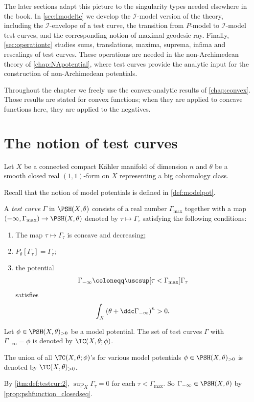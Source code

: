 The later sections adapt this picture to the singularity types needed elsewhere in the book. In \cref{sec:Imodeltc} we develop the $\mathcal I$-model version of the theory, including the $\mathcal I$-envelope of a test curve, the transition from $P$-model to $\mathcal I$-model test curves, and the corresponding notion of maximal geodesic ray. Finally, \cref{sec:operationtc} studies sums, translations, maxima, suprema, infima and rescalings of test curves. These operations are needed in the non-Archimedean theory of \cref{chap:NApotential}, where test curves provide the analytic input for the construction of non-Archimedean potentials.

Throughout the chapter we freely use the convex-analytic results of \cref{chap:convex}. Those results are stated for convex functions; when they are applied to concave functions here, they are applied to the negatives.


\section{The notion of test curves}\label{sec:tc}

Let $X$ be a connected compact K\"ahler manifold of dimension $n$ and $\theta$ be a smooth closed real $(1,1)$-form on $X$ representing a big cohomology class.

Recall that the notion of model potentials is defined in \cref{def:modelpot}.
\begin{definition}\label{def:testcur}
    A \emph{test curve} $\Gamma$ in $\PSH(X,\theta)$ consists of a real number $\Gamma_{\max}$ together with a map $(-\infty,\Gamma_{\max})\rightarrow \PSH(X,\theta)$ denoted by $\tau\mapsto \Gamma_{\tau}$ satisfying the following conditions:
    \begin{enumerate}
        \item\label{itm:def:testcur:1} The map $\tau\mapsto \Gamma_{\tau}$ is concave and decreasing;
        \item\label{itm:def:testcur:2} $P_{\theta}[\Gamma_{\tau}]=\Gamma_{\tau}$;
        \item\label{itm:def:testcur:3} the potential
        \begin{equation}\label{eq:Gammaminf}
        \Gamma_{-\infty}\coloneqq \uscsup[\tau<\Gamma_{\max}]\Gamma_{\tau}
        \end{equation}
        satisfies
        \[
        \int_X \left(\theta+\ddc \Gamma_{-\infty}\right)^n>0.
        \]
    \end{enumerate}
    Let $\phi\in \PSH(X,\theta)_{>0}$ be a model potential.
    The set of test curves $\Gamma$ with $\Gamma_{-\infty}=\phi$ is denoted by $\TC(X,\theta;\phi)$.

    The union of all $\TC(X,\theta;\phi)$'s for various model potentials $\phi\in \PSH(X,\theta)_{>0}$ is denoted by $\TC(X,\theta)_{>0}$.
\end{definition}
By \ref{itm:def:testcur:2}, $\sup_{X}\Gamma_{\tau}=0$ for each $\tau<\Gamma_{\max}$. So $\Gamma_{-\infty}\in \PSH(X,\theta)$ by \cref{prop:pshfunction_closedseq}.

